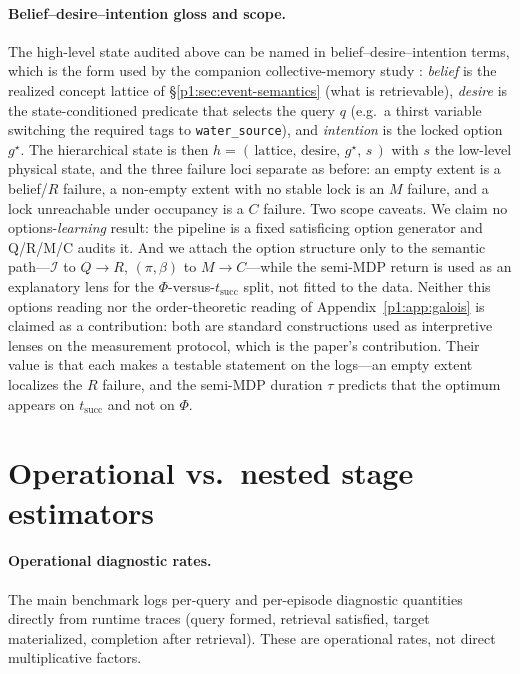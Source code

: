 \documentclass{article}
\newcommand{\method}[1]{\texttt{#1}}
\begin{document}
\paragraph{Belief--desire--intention gloss and scope.}
The high-level state audited above can be named in
belief--desire--intention terms, which is the form used by the
companion collective-memory study \citep{songlines3}: \emph{belief} is the realized concept
lattice of \S\ref{p1:sec:event-semantics} (what is retrievable), \emph{desire}
is the state-conditioned predicate that selects the query $q$ (e.g.\ a
thirst variable switching the required tags to \method{water\_source}),
and \emph{intention} is the locked option $g^\star$. The hierarchical
state is then $h=(\,\text{lattice},\,\text{desire},\,g^\star,\,s\,)$ with
$s$ the low-level physical state, and the three failure loci separate as
before: an empty extent is a belief/$R$ failure, a non-empty extent
with no stable lock is an $M$ failure, and a lock unreachable under
occupancy is a $C$ failure. Two scope caveats. We claim no
options-\emph{learning} result: the pipeline is a fixed satisficing option
generator \citep{simon1955behavioral} and Q/R/M/C audits it. And we attach
the option structure only to the semantic path---$\mathcal{I}$ to
$Q\!\rightarrow\!R$, $(\pi,\beta)$ to $M\!\rightarrow\!C$---while the
semi-MDP return is used as an explanatory lens for the
$\Phi$-versus-$t_{\mathrm{succ}}$ split, not fitted to the data. Neither
this options reading nor the order-theoretic reading of
Appendix~\ref{p1:app:galois} is claimed as a contribution: both are standard
constructions used as interpretive lenses on the measurement protocol,
which is the paper's contribution. Their value is that each makes a
testable statement on the logs---an empty extent localizes the $R$
failure, and the semi-MDP duration $\tau$ predicts that the optimum
appears on $t_{\mathrm{succ}}$ and not on $\Phi$.

\section{Operational vs.\ nested stage estimators}
\label{p1:app:estimators}

\paragraph{Operational diagnostic rates.}
The main benchmark logs per-query and per-episode diagnostic quantities directly from runtime traces (query formed, retrieval satisfied, target materialized, completion after retrieval). These are operational rates, not direct multiplicative factors.
\end{document}
